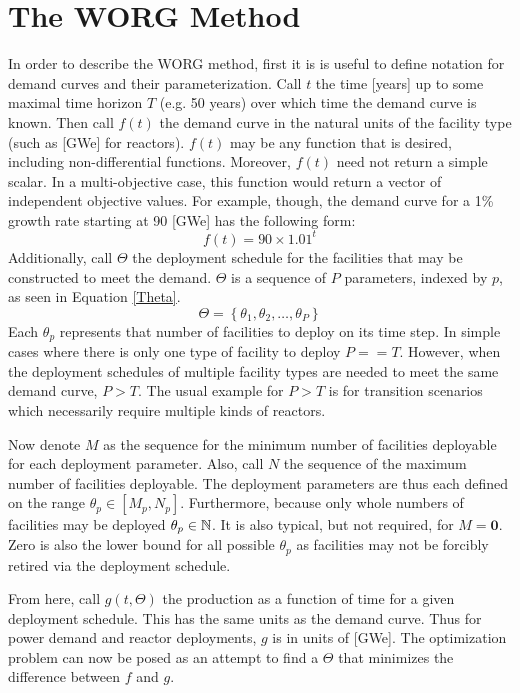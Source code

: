 \section{The WORG Method}
\label{method}

In order to describe the WORG method, first it is is useful to define
notation for demand curves and their parameterization.  Call $t$ the time
[years] up to some maximal time horizon $T$ (e.g. 50 years) over which time
the demand curve is known.  Then call $f(t)$ the demand curve in the natural
units of the facility type (such as [GWe] for reactors).
$f(t)$ may be any function that is desired, including non-differential
functions. Moreover, $f(t)$ need not return a simple scalar.  In a
multi-objective case, this function would return a vector of independent
objective values.
For example, though, the demand curve for a 1\% growth rate
starting at 90 [GWe] has the following form:
\begin{equation}
\label{f-1}
f(t) = 90\times 1.01^t
\end{equation}
Additionally, call $\Theta$ the deployment schedule for the facilities that
may be constructed to meet the demand.
$\Theta$ is a sequence of $P$ parameters, indexed by $p$, as seen in
Equation \ref{Theta}.
\begin{equation}
\label{Theta}
\Theta = \left\{\theta_1, \theta_2, \ldots, \theta_P\right\}
\end{equation}
Each $\theta_p$ represents that number of facilities to deploy on its
time step. In simple cases where there is only one type of facility
to deploy $P == T$.  However, when the deployment schedules of multiple
facility types are needed to meet the same demand curve, $P > T$.  The usual
example for $P > T$ is for transition scenarios which necessarily require
multiple kinds of reactors.

Now denote $M$ as the sequence for the minimum number of facilities deployable
for each deployment parameter. Also, call $N$ the sequence of the maximum number
of facilities deployable. The deployment parameters are thus each defined
on the range $\theta_p \in [M_p, N_p]$. Furthermore, because only whole
numbers of facilities may be deployed $\theta_p \in \mathbb{N}$.  It is also typical,
but not required, for $M = \mathbf{0}$. Zero is also the lower bound
for all possible $\theta_p$ as facilities may not be forcibly retired via the
deployment schedule.

From here, call $g(t, \Theta)$ the production as a function of time for a
given deployment schedule. This has the same units as the demand curve.
Thus for power demand and reactor deployments, $g$ is in units of [GWe]. The
optimization problem can now be posed as an attempt to find a $\Theta$
that minimizes the difference between $f$ and $g$.




